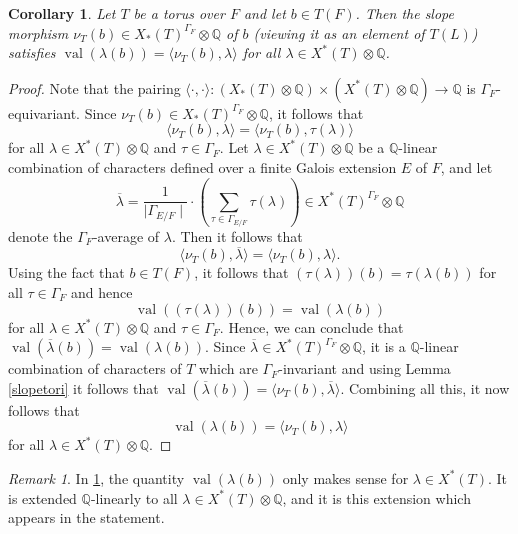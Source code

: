 \documentclass[11pt,a4paper]{article}
\theoremstyle{definition}
\theoremstyle{plain}
\newtheorem{C}[shared]{Corollary}
\theoremstyle{remark}
\newtheorem{R}[shared]{Remark}
\theoremstyle{plain}
\DeclareMathOperator{\val}{val}
\begin{document}
\begin{C}\label{slopetorispecialcase}
    Let $T$ be a torus over $F$ and let $b \in T(F)$. Then the slope morphism $\nu_T(b) \in X_*(T)^{\Gamma_F} \otimes \mathbb{Q}$ of $b$ (viewing it as an element of $T(L)$) satisfies $\val(\lambda (b)) = \langle \nu_T(b), \lambda \rangle$ for all $\lambda \in X^*(T) \otimes \mathbb{Q}$.
\end{C}
\begin{proof}
    Note that the pairing $\langle \cdot, \cdot \rangle: (X_*(T)\otimes \mathbb{Q}) \times (X^*(T) \otimes \mathbb{Q}) \xrightarrow[]{} \mathbb{Q}$ is $\Gamma_F$-equivariant. Since $\nu_T(b) \in X_*(T)^{\Gamma_F} \otimes  \mathbb{Q}$, it follows that $$\langle \nu_T(b), \lambda \rangle = \langle \nu_T(b), \tau(\lambda) \rangle$$ for all $\lambda \in X^*(T) \otimes \mathbb{Q}$ and $\tau \in \Gamma_F$. Let $\lambda \in X^*(T) \otimes \mathbb{Q}$ be a $\mathbb{Q}$-linear combination of characters defined over a finite Galois extension $E$ of $F$, and let $$\overline{\lambda} = \frac{1}{\mid \Gamma_{E/F} \mid}\cdot (\sum_{\tau \in \Gamma_{E/F}} \tau  (\lambda) ) \in X^*(T)^{\Gamma_F}\otimes \mathbb{Q}$$ denote the $\Gamma_F$-average of $\lambda$. Then it follows that $$\langle \nu_T(b) , \overline{\lambda} \rangle = \langle \nu_T(b), \lambda \rangle.$$ 
    Using the fact that $b \in T(F)$, it follows that $(\tau(\lambda))(b) = \tau(\lambda(b))$ for all $\tau \in \Gamma_F$ and hence $$ \val((\tau(\lambda))(b)) = \val(\lambda(b))$$ for all $\lambda \in X^*(T) \otimes \mathbb{Q}$ and $\tau \in \Gamma_F$. Hence, we can conclude that $\val(\overline{\lambda}(b)) = \val (\lambda(b))$. Since $\overline{\lambda} \in X^*(T)^{\Gamma_F} \otimes \mathbb{Q}$, it is a $\mathbb{Q}$-linear combination of characters of $T$ which are $\Gamma_F$-invariant and using Lemma \ref{slopetori} it follows that $\val(\overline{\lambda}(b)) = \langle \nu_T(b), \overline{\lambda} \rangle$. Combining all this, it now follows that $$\val(\lambda (b)) = \langle \nu_T(b), \lambda \rangle$$ for all $\lambda \in X^*(T) \otimes \mathbb{Q}$.
\end{proof}

\begin{R}\label{valQextension}
    In \ref{slopetorispecialcase}, the quantity $\val(\lambda(b))$ only makes sense for $\lambda \in X^*(T)$. It is extended $\mathbb{Q}$-linearly to all $\lambda \in X^*(T) \otimes \mathbb{Q}$, and it is this extension which appears in the statement.
\end{R}
\end{document}
